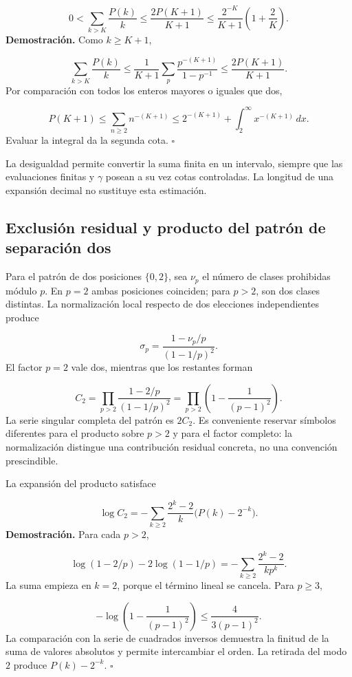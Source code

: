\[
0<\sum_{k>K}\frac{P(k)}k
\le\frac{2P(K+1)}{K+1}
\le\frac{2^{-K}}{K+1}\left(1+\frac2K\right).
\]
\textbf{Demostración.} Como $k\ge K+1$,

\[
\sum_{k>K}\frac{P(k)}k
\le\frac1{K+1}\sum_p\frac{p^{-(K+1)}}{1-p^{-1}}
\le\frac{2P(K+1)}{K+1}.
\]
Por comparación con todos los enteros mayores o iguales que dos,

\[
P(K+1)\le\sum_{n\ge2}n^{-(K+1)}
\le2^{-(K+1)}+\int_2^\infty x^{-(K+1)}\,dx.
\]
Evaluar la integral da la segunda cota. \hfill\(\square\)

La desigualdad permite convertir la suma finita en un intervalo, siempre que las evaluaciones finitas y $\gamma$ posean a su vez cotas controladas. La longitud de una expansión decimal no sustituye esta estimación.

\subsection{Exclusión residual y producto del patrón de separación dos}
Para el patrón de dos posiciones \(\{0,2\}\), sea $\nu_p$ el número de clases prohibidas módulo $p$. En $p=2$ ambas posiciones coinciden; para $p>2$, son dos clases distintas. La normalización local respecto de dos elecciones independientes produce

\[
\sigma_p=\frac{1-\nu_p/p}{(1-1/p)^2}.
\]
El factor $p=2$ vale dos, mientras que los restantes forman

\[
C_2=\prod_{p>2}\frac{1-2/p}{(1-1/p)^2}
=\prod_{p>2}\left(1-\frac1{(p-1)^2}\right).
\]
La serie singular completa del patrón es $2C_2$. Es conveniente reservar símbolos diferentes para el producto sobre $p>2$ y para el factor completo: la normalización distingue una contribución residual concreta, no una convención prescindible.

La expansión del producto satisface

\[
\log C_2=-\sum_{k\ge2}\frac{2^k-2}{k}\bigl(P(k)-2^{-k}\bigr).
\]
\textbf{Demostración.} Para cada $p>2$,

\[
\log(1-2/p)-2\log(1-1/p)
=-\sum_{k\ge2}\frac{2^k-2}{kp^k}.
\]
La suma empieza en $k=2$, porque el término lineal se cancela. Para \(p\ge3\),

\[
-\log\left(1-\frac1{(p-1)^2}\right)\le\frac4{3(p-1)^2}.
\]
La comparación con la serie de cuadrados inversos demuestra la finitud de la suma de valores absolutos y permite intercambiar el orden. La retirada del modo $2$ produce $P(k)-2^{-k}$. \hfill\(\square\)

